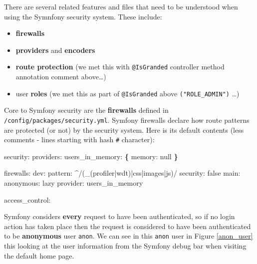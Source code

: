 \documentclass[a4paperpaper,openright]{book}
\newenvironment{Shaded}{}{}
\newcommand{\AttributeTok}[1]{\textcolor[rgb]{0.49,0.56,0.16}{#1}}
\newcommand{\CharTok}[1]{\textcolor[rgb]{0.25,0.44,0.63}{#1}}
\newcommand{\FunctionTok}[1]{\textcolor[rgb]{0.02,0.16,0.49}{#1}}
\newcommand{\KeywordTok}[1]{\textcolor[rgb]{0.00,0.44,0.13}{\textbf{#1}}}
\providecommand{\tightlist}{%
  \setlength{\itemsep}{0pt}\setlength{\parskip}{0pt}}
\begin{document}
There are several related features and files that need to be understood
when using the Symnfony security system. These include:

\begin{itemize}
\tightlist
\item
  \textbf{firewalls}
\item
  \textbf{providers} and \textbf{encoders}
\item
  \textbf{route protection} (we met this with \texttt{@IsGranded}
  controller method annotation comment above\ldots{})
\item
  user \textbf{roles} (we met this as part of \texttt{@IsGranded} above
  \texttt{("ROLE\_ADMIN")} \ldots{})
\end{itemize}

Core to Symfony security are the \textbf{firewalls} defined in
\texttt{/config/packages/security.yml}. Symfony firewalls declare how
route patterns are protected (or not) by the security system. Here is
its default contents (less comments - lines starting with hash
\texttt{\#} character):

\begin{Shaded}
\begin{Highlighting}[]
    \FunctionTok{security:}
        \FunctionTok{providers:}
            \FunctionTok{users_in_memory:}\AttributeTok{ }\KeywordTok{\{} \FunctionTok{memory:}\AttributeTok{ }\CharTok{null}\AttributeTok{ }\KeywordTok{\}}

        \FunctionTok{firewalls:}
            \FunctionTok{dev:}
                \FunctionTok{pattern:}\AttributeTok{ ^/(_(profiler|wdt)|css|images|js)/}
                \FunctionTok{security:}\AttributeTok{ }\CharTok{false}
            \FunctionTok{main:}
                \FunctionTok{anonymous:}\AttributeTok{ lazy}
                \FunctionTok{provider:}\AttributeTok{ users_in_memory}
    
        \FunctionTok{access_control:}
\end{Highlighting}
\end{Shaded}

Symfony considers \textbf{every} request to have been authenticated, so
if no login action has taken place then the request is considered to
have been authenticated to be \textbf{anonymous} user \texttt{anon}. We
can see in this \texttt{anon} user in Figure \ref{anon_user} this
looking at the user information from the Symfony debug bar when visiting
the default home page.
\end{document}
